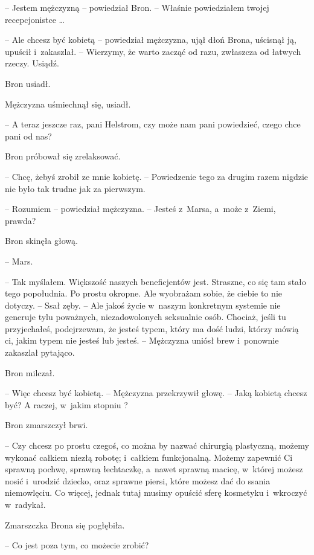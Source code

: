 \documentclass[oneside,polish,11pt,rmheadings]{mwbk}
\begin{document}
-- Jestem mężczyzną -- powiedział Bron. -- Właśnie powiedziałem twojej recepcjonistce \ldots  

-- Ale chcesz być kobietą -- powiedział mężczyzna, ujął dłoń Brona, uścisnął ją, upuścił i~zakaszlał.  -- Wierzymy, że warto zacząć od razu, zwłaszcza od łatwych rzeczy. Usiądź. 

Bron usiadł. 

Mężczyzna uśmiechnął się, usiadł.

-- A teraz jeszcze raz, pani Helstrom, czy może nam pani powiedzieć, czego chce pani od nas? 

Bron próbował się zrelaksować. 

-- Chcę, żebyś zrobił ze mnie kobietę. -- Powiedzenie tego za drugim razem nigdzie nie było tak trudne jak za pierwszym. 

-- Rozumiem -- powiedział mężczyzna. -- Jesteś z~Marsa, a~może z~Ziemi, prawda? 

Bron skinęła głową. 

-- Mars.

-- Tak myślałem. Większość naszych beneficjentów jest. Straszne, co się tam stało tego popołudnia. Po prostu okropne. Ale wyobrażam sobie, że ciebie to nie dotyczy. -- Ssał zęby. -- Ale jakoś życie w~naszym konkretnym systemie nie generuje tylu poważnych, niezadowolonych seksualnie osób. Chociaż, jeśli tu przyjechałeś, podejrzewam, że jesteś typem, który ma dość ludzi, którzy mówią ci, jakim typem nie jesteś lub jesteś. -- Mężczyzna uniósł brew i~ponownie zakaszlał pytająco. 

Bron milczał.

-- Więc chcesz być kobietą. --  Mężczyzna przekrzywił głowę. -- Jaką kobietą chcesz być? A raczej, w~jakim stopniu ? 

Bron zmarszczył brwi. 

-- Czy chcesz po prostu czegoś, co można by nazwać chirurgią plastyczną, możemy wykonać całkiem niezłą robotę; i~całkiem funkcjonalną. Możemy zapewnić Ci sprawną pochwę, sprawną łechtaczkę, a~nawet sprawną macicę, w~której możesz nosić i~urodzić dziecko, oraz sprawne piersi, które możesz dać do ssania niemowlęciu. Co więcej, jednak tutaj musimy opuścić sferę kosmetyku i~wkroczyć w~radykał. 

Zmarszczka Brona się pogłębiła. 

-- Co jest poza tym, co możecie zrobić? 
\end{document}
